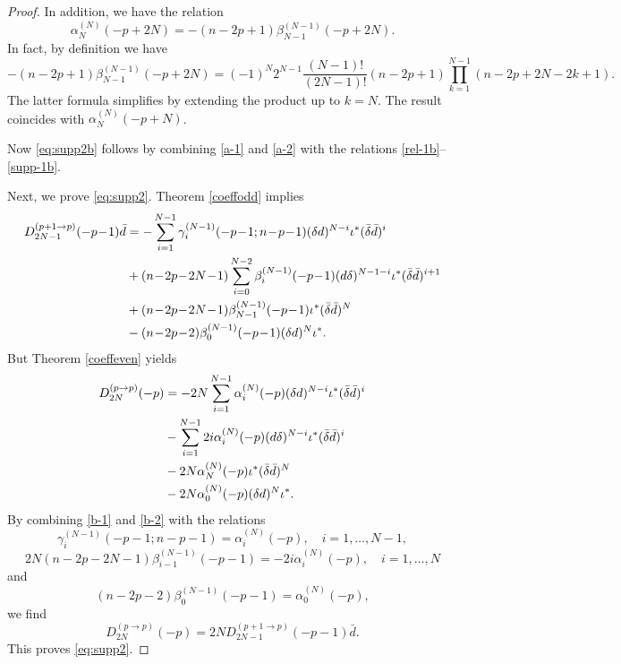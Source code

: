 \documentclass[a4paper,12pt,reqno]{amsart}
\numberwithin{theorem}{subsection}
\numberwithin{equation}{section}
\begin{document}
\begin{proof}
In addition, we have the relation
\begin{equation}\label{supp-1b}
   \alpha_N^{(N)}(-p\!+\!2N) = -(n\!-\!2p\!+\!1) \beta_{N-1}^{(N-1)}(-p\!+\!2N).
\end{equation}
In fact, by definition we have
$$
   -(n\!-\!2p\!+\!1) \beta_{N-1}^{(N-1)}(-p\!+\!2N) = (-1)^{N} 2^{N-1}
   \frac{(N\!-\!1)!}{(2N\!-\!1)!} (n\!-\!2p\!+\!1) \prod_{k=1}^{N-1} (n\!-\!2p\!+\!2N\!-\!2k\!+\!1).
$$
The latter formula simplifies by extending the product up to $k=N$. The result
coincides with $\alpha_N^{(N)}(-p+N)$.

Now \eqref{eq:supp2b} follows by combining \eqref{a-1} and \eqref{a-2} with the
relations \eqref{rel-1b}--\eqref{supp-1b}.

Next, we prove \eqref{eq:supp2}. Theorem \ref{coeffodd} implies
\begin{align}\label{b-1}
   D_{2N-1}^{(p+1 \to p)}(-p\!-\!1) \bar{d} & = -\sum_{i=1}^{N-1}
   \gamma_i^{(N-1)}(-p\!-\!1;n\!-\!p\!-\!1) (\delta {d})^{N-i} \iota^* (\bar{\delta} \bar{d})^i \notag \\
   & + (n\!-\!2p\!-\!2N\!-\!1) \sum_{i=0}^{N-2} \beta_i^{(N-1)}(-p\!-\!1) ({d} \delta)^{N-1-i} \iota^* (\bar{\delta}
   \bar{d})^{i+1} \notag \\
   & + (n\!-\!2p\!-\!2N\!-\!1) \beta_{N-1}^{(N-1)}(-p\!-\!1) \iota^* (\bar{\delta} \bar{d})^N \notag \\
   & - (n\!-\!2p\!-\!2) \beta_0^{(N-1)}(-p\!-\!1) (\delta {d})^N \iota^*.
\end{align}
But Theorem \ref{coeffeven} yields
\begin{align}\label{b-2}
   D_{2N}^{(p \to p)}(-p)
   & = -2N \sum_{i=1}^{N-1} \alpha_i^{(N)}(-p) (\delta {d})^{N-i} \iota^* (\bar{\delta} \bar{d})^i \notag  \\
   & - \sum_{i=1}^{N-1} 2i \alpha_i^{(N)}(-p) ({d} \delta)^{N-i} \iota^* (\bar{\delta}
   \bar{d})^i \notag \\
   & - 2N \alpha_N^{(N)}(-p) \iota^* (\bar{\delta} \bar{d})^N \notag \\
   & - 2N \alpha_0^{(N)}(-p) (\delta {d})^{N} \iota^*.
\end{align}
By combining \eqref{b-1} and \eqref{b-2} with the relations
\begin{equation}\label{rel-2a}
   \gamma_i^{(N-1)}(-p\!-\!1;n\!-\!p\!-\!1) = \alpha_i^{(N)}(-p), \quad
   i=1,\dots,N-1,
\end{equation}
\begin{equation}\label{rel-2b}
   2N (n\!-\!2p\!-\!2N\!-\!1) \beta_{i-1}^{(N-1)}(-p\!-\!1) = -2i \alpha_i^{(N)}(-p), \quad i=1,\dots,N
\end{equation}
and
\begin{equation}\label{rel-2c}
   (n\!-\!2p\!-\!2) \beta_0^{(N-1)}(-p\!-\!1) = \alpha_0^{(N)}(-p),
\end{equation}
we find
$$
   D_{2N}^{(p \to p)}(-p) = 2N D_{2N-1}^{(p+1 \to p)}(-p\!-\!1) \bar{d}.
$$
This proves \eqref{eq:supp2}.


\end{proof}
\end{document}
